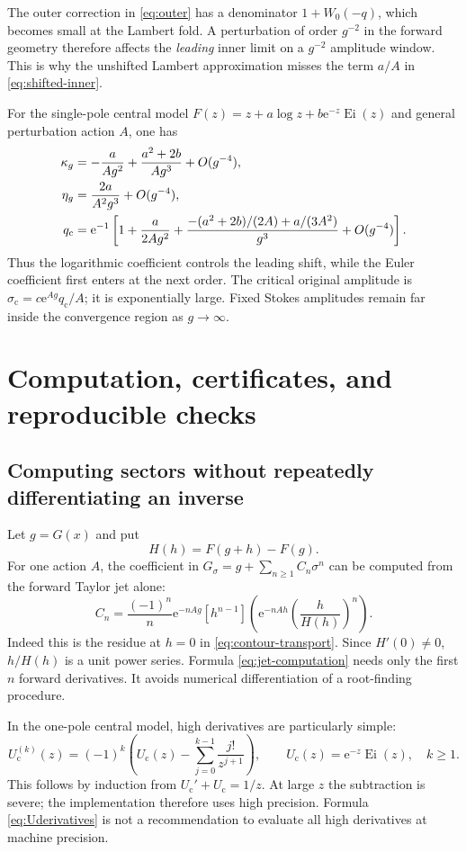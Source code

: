 \documentclass[11pt,a4paper]{article}
\numberwithin{equation}{section}
\theoremstyle{definition}
\theoremstyle{remark}
\newcommand{\e}{\mathrm e}
\newcommand{\cU}{U_{\mathrm c}}
\DeclareMathOperator{\Ei}{Ei}
\begin{document}
The outer correction in \eqref{eq:outer} has a denominator $1+W_0(-q)$, which becomes small at the Lambert fold. A perturbation of order $g^{-2}$ in the forward geometry therefore affects the \emph{leading} inner limit on a $g^{-2}$ amplitude window. This is why the unshifted Lambert approximation misses the term $a/A$ in \eqref{eq:shifted-inner}.

For the single-pole central model $F(z)=z+a\log z+b\e^{-z}\Ei(z)$ and general perturbation action $A$, one has
\begin{align}
 \kappa_g&=-\frac{a}{Ag^2}+\frac{a^2+2b}{Ag^3}+O(g^{-4}),\notag\\
 \eta_g&=\frac{2a}{A^2g^3}+O(g^{-4}),\label{eq:model-curvature}\\
 q_{\mathrm c}&=\e^{-1}\left[
 1+\frac{a}{2Ag^2}
 +\frac{-(a^2+2b)/(2A)+a/(3A^2)}{g^3}+O(g^{-4})\right].\notag
\end{align}
Thus the logarithmic coefficient controls the leading shift, while the Euler coefficient first enters at the next order. The critical original amplitude is
$\sigma_{\mathrm c}=c\e^{Ag}q_{\mathrm c}/A$; it is exponentially large. Fixed Stokes amplitudes remain far inside the convergence region as $g\to\infty$.

\section{Computation, certificates, and reproducible checks}
\label{sec:computation}

\subsection{Computing sectors without repeatedly differentiating an inverse}
Let $g=G(x)$ and put
\[
 H(h)=F(g+h)-F(g).
\]
For one action $A$, the coefficient in $G_\sigma=g+\sum_{n\geq1}C_n\sigma^n$ can be computed from the forward Taylor jet alone:
\begin{equation}
 C_n=\frac{(-1)^n}{n}\e^{-nAg}
 [h^{n-1}]\left(\e^{-nAh}\left(\frac{h}{H(h)}\right)^n\right).
 \label{eq:jet-computation}
\end{equation}
Indeed this is the residue at $h=0$ in \eqref{eq:contour-transport}. Since $H'(0)\neq0$, $h/H(h)$ is a unit power series. Formula \eqref{eq:jet-computation} needs only the first $n$ forward derivatives. It avoids numerical differentiation of a root-finding procedure.

In the one-pole central model, high derivatives are particularly simple:
\begin{equation}
 \cU^{(k)}(z)=(-1)^k\left(\cU(z)-
                   \sum_{j=0}^{k-1}\frac{j!}{z^{j+1}}\right),
 \qquad \cU(z)=\e^{-z}\Ei(z),\quad k\geq1.
 \label{eq:Uderivatives}
\end{equation}
This follows by induction from $\cU'+\cU=1/z$. At large $z$ the subtraction is severe; the implementation therefore uses high precision. Formula \eqref{eq:Uderivatives} is not a recommendation to evaluate all high derivatives at machine precision.
\end{document}
